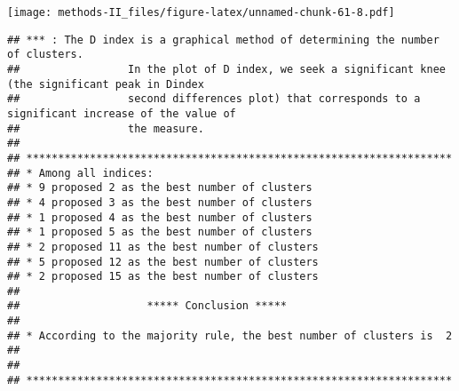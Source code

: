 \documentclass[
]{article}
\newenvironment{Shaded}{\begin{snugshade}}{\end{snugshade}}
\newcommand{\CommentTok}[1]{\textcolor[rgb]{0.56,0.35,0.01}{\textit{#1}}}
\newcommand{\NormalTok}[1]{#1}
\newcommand{\SpecialCharTok}[1]{\textcolor[rgb]{0.00,0.00,0.00}{#1}}
\begin{document}
\texttt{[image: methods-II\_files/figure-latex/unnamed-chunk-61-8.pdf]}

\begin{verbatim}
## *** : The D index is a graphical method of determining the number of clusters. 
##                 In the plot of D index, we seek a significant knee (the significant peak in Dindex
##                 second differences plot) that corresponds to a significant increase of the value of
##                 the measure. 
##  
## ******************************************************************* 
## * Among all indices:                                                
## * 9 proposed 2 as the best number of clusters 
## * 4 proposed 3 as the best number of clusters 
## * 1 proposed 4 as the best number of clusters 
## * 1 proposed 5 as the best number of clusters 
## * 2 proposed 11 as the best number of clusters 
## * 5 proposed 12 as the best number of clusters 
## * 2 proposed 15 as the best number of clusters 
## 
##                    ***** Conclusion *****                            
##  
## * According to the majority rule, the best number of clusters is  2 
##  
##  
## *******************************************************************
\end{verbatim}

\begin{Shaded}
\end{Shaded}
\end{document}
